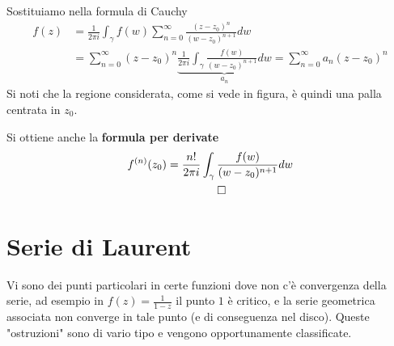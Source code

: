 \documentclass[10pt,a4paper,twoside]{book}
\begin{document}
\begin{figure}[htpb]
	
\end{figure}
\FloatBarrier



Sostituiamo nella formula di Cauchy
\begin{align*}
f( z) & =\frac{1}{2\pi i}\int _{\gamma } f( w)\sum ^{\infty }_{n=0}\frac{( z-z_{0})^{n}}{( w-z_{0})^{n+1}} dw\\
 & =\sum ^{\infty }_{n=0}( z-z_{0})^{n}\underbrace{\frac{1}{2\pi i}\int _{\gamma }\frac{f( w)}{( w-z_{0})^{n+1}} dw}_{a_{n}} =\sum ^{\infty }_{n=0} a_{n}( z-z_{0})^{n}
\end{align*}
Si noti che la regione considerata, come si vede in figura, è quindi una palla centrata in $z_{0}$.

Si ottiene anche la \textbf{formula per derivate}
\begin{gather*}
f^{(n)}( z_{0}) =\frac{n!}{2\pi i}\int _{\gamma }\frac{f(w)}{( w-z_{0})^{n+1}} dw\\
\qed 
\end{gather*}
\section{Serie di Laurent}

Vi sono dei punti particolari in certe funzioni dove non c'è convergenza della serie, ad esempio in $f( z) =\frac{1}{1-z}$ il punto $1$ è critico, e la serie geometrica associata non converge in tale punto (e di conseguenza nel disco). Queste "ostruzioni" sono di vario tipo e vengono opportunamente classificate.
\end{document}
